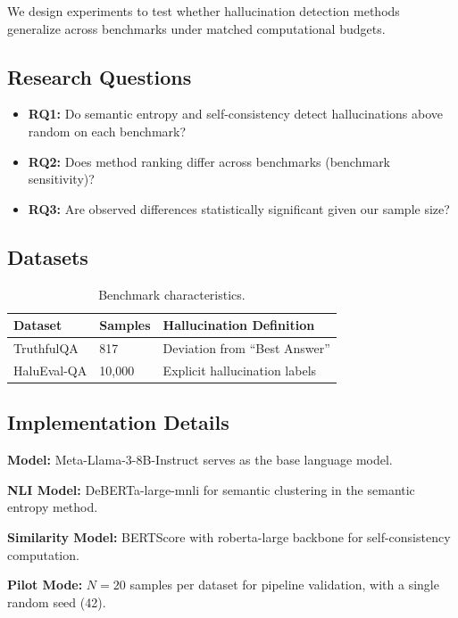 We design experiments to test whether hallucination detection methods generalize across benchmarks under matched computational budgets.

\subsection{Research Questions}

\begin{itemize}
    \item \textbf{RQ1:} Do semantic entropy and self-consistency detect hallucinations above random on each benchmark?
    \item \textbf{RQ2:} Does method ranking differ across benchmarks (benchmark sensitivity)?
    \item \textbf{RQ3:} Are observed differences statistically significant given our sample size?
\end{itemize}

\subsection{Datasets}

\begin{table}[h]
\centering
\begin{tabular}{@{}lll@{}}
\toprule
\textbf{Dataset} & \textbf{Samples} & \textbf{Hallucination Definition} \\
\midrule
TruthfulQA & 817 & Deviation from ``Best Answer'' \\
HaluEval-QA & 10,000 & Explicit hallucination labels \\
\bottomrule
\end{tabular}
\caption{Benchmark characteristics.}
\label{tab:datasets}
\end{table}

\subsection{Implementation Details}

\textbf{Model:} Meta-Llama-3-8B-Instruct serves as the base language model.

\textbf{NLI Model:} DeBERTa-large-mnli for semantic clustering in the semantic entropy method.

\textbf{Similarity Model:} BERTScore with roberta-large backbone for self-consistency computation.

\textbf{Pilot Mode:} $N=20$ samples per dataset for pipeline validation, with a single random seed (42).
